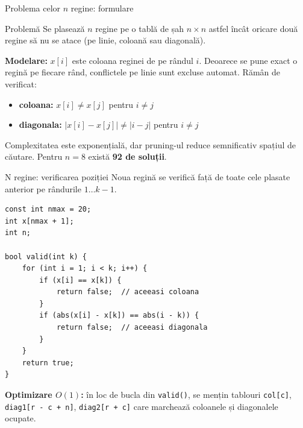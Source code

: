 \documentclass[8pt,mathserif]{beamer}
\begin{document}
\begin{frame}{Problema celor $n$ regine: formulare}
  \begin{block}{Problemă}
    Se plasează $n$ regine pe o tablă de șah $n \times n$ astfel încât oricare două regine să nu se atace (pe linie, coloană sau diagonală).
  \end{block}
  \textbf{Modelare:} $x[i]$ este coloana reginei de pe rândul $i$. Deoarece se pune exact o regină pe fiecare rând, conflictele pe linie sunt excluse automat. Rămân de verificat:
  \begin{itemize}
    \item \textbf{coloana:} $x[i] \ne x[j]$ pentru $i \ne j$
    \item \textbf{diagonala:} $|x[i] - x[j]| \ne |i - j|$ pentru $i \ne j$
  \end{itemize}
  \smallskip
  \begin{center}
  \end{center}
  Complexitatea este exponențială, dar pruning-ul reduce semnificativ spațiul de căutare. Pentru $n = 8$ există \textbf{92 de soluții}.
\end{frame}

\begin{frame}[fragile]{N regine: verificarea poziției}
  Noua regină se verifică față de toate cele plasate anterior pe rândurile $1 \ldots k{-}1$.
  \begin{lstlisting}
const int nmax = 20;
int x[nmax + 1];
int n;

bool valid(int k) {
    for (int i = 1; i < k; i++) {
        if (x[i] == x[k]) {
            return false;  // aceeasi coloana
        }
        if (abs(x[i] - x[k]) == abs(i - k)) {
            return false;  // aceeasi diagonala
        }
    }
    return true;
}
  \end{lstlisting}
  \textbf{Optimizare $O(1)$:} în loc de bucla din \texttt{valid()}, se mențin tablouri \texttt{col[c]}, \texttt{diag1[r - c + n]}, \texttt{diag2[r + c]} care marchează coloanele și diagonalele ocupate.
\end{frame}
\end{document}
